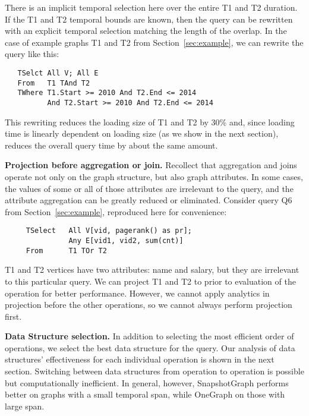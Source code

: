There is an implicit temporal selection here over the entire T1 and T2
duration.  If the T1 and T2 temporal bounds are known, then the query
can be rewritten with an explicit temporal selection matching the
length of the overlap.  In the case of example graphs T1 and T2 from
Section~\ref{sec:example}, we can rewrite the query like this:

\begin{small}
\begin{verbatim}
   TSelct All V; All E
   From   T1 TAnd T2
   TWhere T1.Start >= 2010 And T2.End <= 2014 
          And T2.Start >= 2010 And T2.End <= 2014
\end{verbatim}
\end{small}

This rewriting reduces the loading size of T1 and T2 by 30\% and,
since loading time is linearly dependent on loading size (as we show
in the next section), reduces the overall query time by about the same
amount.

{\bf Projection before aggregation or join.}  Recollect that
aggregation and joins operate not only on the graph structure, but
also graph attributes.  In some cases, the values of some or all of
those attributes are irrelevant to the query, and the attribute
aggregation can be greatly reduced or eliminated.  Consider query Q6
from Section~\ref{sec:example}, reproduced here for convenience:

\begin{small}
\begin{verbatim}
     TSelect   All V[vid, pagerank() as pr]; 
               Any E[vid1, vid2, sum(cnt)]
     From      T1 TOr T2
\end{verbatim}
\end{small}

T1 and T2 vertices have two attributes: name and salary, but they are
irrelevant to this particular query.  We can project T1 and T2 to
 prior to evaluation of the  operation for
better performance.  However, we cannot apply analytics in projection
before the other operations, so we cannot always perform projection
first.

{\bf Data Structure selection.} In addition to selecting the most
efficient order of operations, we select the best data structure for
the query.  Our analysis of data structures' effectiveness for each
individual operation is shown in the next section.  Switching between
data structures from operation to operation is possible but
computationally inefficient.  In general, however, SnapshotGraph
performs better on graphs with a small temporal span, while OneGraph
on those with large span.

